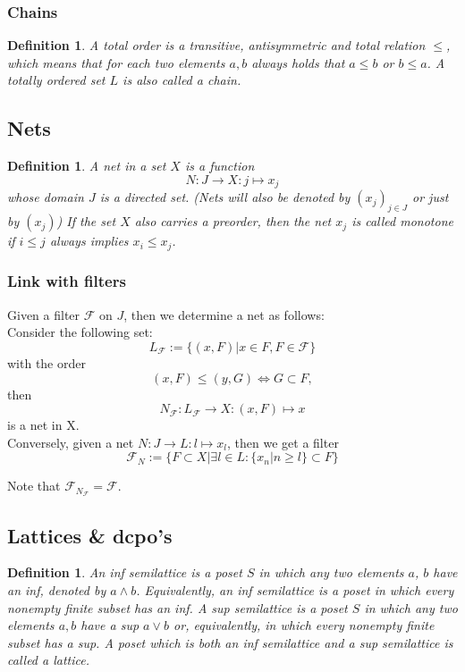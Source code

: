 \documentclass[a4paper,12pt]{article}
\newtheorem{definition}[theorem]{Definition}
\begin{document}
\subsubsection{Chains}
\begin{definition}
A \emph{total order} is a transitive, antisymmetric and total relation $\leq$, which means that for each two elements $a,b$ always holds that $a \leq b$ or $b \leq a$. A totally ordered set $L$ is also called a \emph{chain}.
\end{definition}


\subsection{Nets}
\begin{definition}
A \emph{net} in a set $X$ is a function
$$N: J \rightarrow X : j \mapsto x_j$$
whose domain $J$ is a directed set. (Nets will also be denoted by $(x_j)_{j\in J}$ or just by $(x_j)$) If the set $X$ also carries a preorder, then the net $x_j$ is called \emph{monotone} if $i \leq j$ always implies $x_i \leq x_j$.
\end{definition}

\subsubsection{Link with filters}
Given a filter $\mathcal{F}$ on $J$, then we determine a net as follows:\\
Consider the following set:
$$L_\mathcal{F} := \{(x,F)|x\in F, F\in\mathcal{F}\}$$
with the order
$$(x,F) \leq (y, G) \Leftrightarrow G \subset F,$$
then
$$N_\mathcal{F}: L_\mathcal{F} \rightarrow X: (x, F) \mapsto x$$
is a net in X.\\

Conversely, given a net $N: J \rightarrow L: l \mapsto x_l$, then we get a filter
$$\mathcal{F}_N := \{F \subset X | \exists l \in L: \{x_n | n \geq l\} \subset F\} $$

Note that $\mathcal{F}_{N_\mathcal{F}} = \mathcal{F}.$

\subsection{Lattices \& dcpo's}
\begin{definition}
An \emph{inf semilattice} is a poset $S$ in which any two elements $a$, $b$ have an inf, denoted by $a \wedge b$. Equivalently, an \emph{inf semilattice} is a poset in which every nonempty finite subset has an inf. A \emph{sup semilattice} is a poset $S$ in which any two elements $a, b$ have a sup $a \vee b$ or, equivalently, in which every nonempty finite subset has a sup. A poset which is both an \emph{inf semilattice} and a \emph{sup semilattice} is called a \emph{lattice}.
\end{definition}
\end{document}
